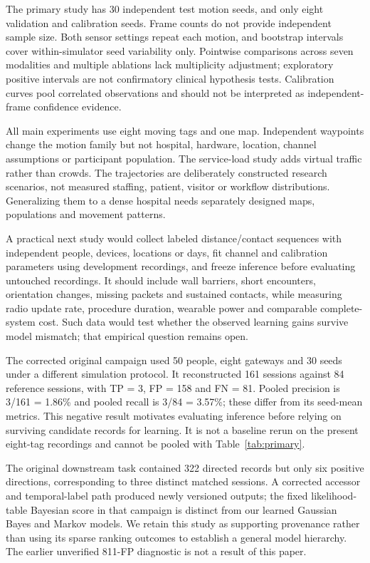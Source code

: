 \documentclass[12pt,a4paper]{report}
\begin{document}
The primary study has 30 independent test motion seeds, and only eight validation and calibration seeds. Frame counts do not provide independent sample size. Both sensor settings repeat each motion, and bootstrap intervals cover within-simulator seed variability only. Pointwise comparisons across seven modalities and multiple ablations lack multiplicity adjustment; exploratory positive intervals are not confirmatory clinical hypothesis tests. Calibration curves pool correlated observations and should not be interpreted as independent-frame confidence evidence.

All main experiments use eight moving tags and one map. Independent waypoints change the motion family but not hospital, hardware, location, channel assumptions or participant population. The service-load study adds virtual traffic rather than crowds. The trajectories are deliberately constructed research scenarios, not measured staffing, patient, visitor or workflow distributions. Generalizing them to a dense hospital needs separately designed maps, populations and movement patterns.

A practical next study would collect labeled distance/contact sequences with independent people, devices, locations or days, fit channel and calibration parameters using development recordings, and freeze inference before evaluating untouched recordings. It should include wall barriers, short encounters, orientation changes, missing packets and sustained contacts, while measuring radio update rate, procedure duration, wearable power and comparable complete-system cost. Such data would test whether the observed learning gains survive model mismatch; that empirical question remains open.

The corrected original campaign used 50 people, eight gateways and 30 seeds under a different simulation protocol. It reconstructed 161 sessions against 84 reference sessions, with TP = 3, FP = 158 and FN = 81. Pooled precision is 3/161 = 1.86\% and pooled recall is 3/84 = 3.57\%; these differ from its seed-mean metrics. This negative result motivates evaluating inference before relying on surviving candidate records for learning. It is not a baseline rerun on the present eight-tag recordings and cannot be pooled with Table~\ref{tab:primary}.

The original downstream task contained 322 directed records but only six positive directions, corresponding to three distinct matched sessions. A corrected accessor and temporal-label path produced newly versioned outputs; the fixed likelihood-table Bayesian score in that campaign is distinct from our learned Gaussian Bayes and Markov models. We retain this study as supporting provenance rather than using its sparse ranking outcomes to establish a general model hierarchy. The earlier unverified 811-FP diagnostic is not a result of this paper.
\end{document}
